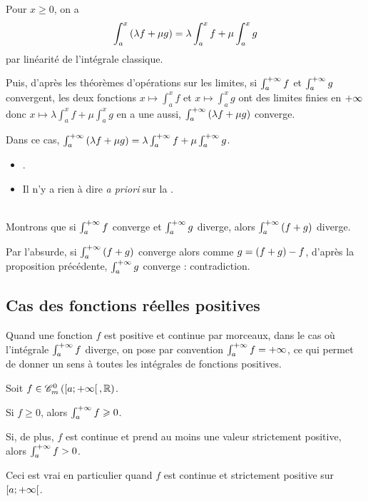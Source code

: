 \begin{dem}
Pour \(x\geq0\), on a \[\int_a^x\left(\lambda f+\mu g\right)=\lambda\int_a^xf+\mu\int_a^xg\] par linéarité de l'intégrale classique.

Puis, d'après les théorèmes d'opérations sur les limites, si \(\int_a^{+\infty}f\) et \(\int_a^{+\infty}g\) convergent, les deux fonctions \(x\mapsto\int_a^xf\) et \(x\mapsto\int_a^xg\) ont des limites finies en \(+\infty\) donc \(x\mapsto\lambda\int_a^xf+\mu\int_a^xg\) en a une aussi, \ie \(\int_a^{+\infty}\left(\lambda f+\mu g\right)\) converge.

Dans ce cas, \(\int_a^{+\infty}\left(\lambda f+\mu g\right)=\lambda\int_a^{+\infty}f+\mu\int_a^{+\infty}g\).
\end{dem}

\begin{rem}
\begin{itemize}
    \item {}. \\
    \item Il n'y a rien à dire \textit{a priori} sur la .
\end{itemize}
\end{rem}

\begin{dem}~\\
Montrons que si \(\int_a^{+\infty}f\) converge et \(\int_a^{+\infty}g\) diverge, alors \(\int_a^{+\infty}\left(f+g\right)\) diverge.

Par l'absurde, si \(\int_a^{+\infty}\left(f+g\right)\) converge alors comme \(g=\left(f+g\right)-f\), d'après la proposition précédente, \(\int_a^{+\infty}g\) converge : contradiction.
\end{dem}

\subsection{Cas des fonctions réelles positives}

Quand une fonction \(f\) est positive et continue par morceaux, dans le cas où l'intégrale \(\int_a^{+\infty}f\) diverge, on pose par convention \(\int_a^{+\infty}f=+\infty\), ce qui permet de donner un sens à toutes les intégrales de fonctions positives.

\begin{prop}
Soit \(f\in\contm[\intervie{a}{\pinf}][\R]\).

Si \(f\geq0\), alors \(\int_a^{+\infty}f\geqslant0\).

Si, de plus, \(f\) est continue et prend au moins une valeur strictement positive, alors \(\int_a^{+\infty}f>0\).

Ceci est vrai en particulier quand \(f\) est continue et strictement positive sur \(\left[a;+\infty\right[\).
\end{prop}

